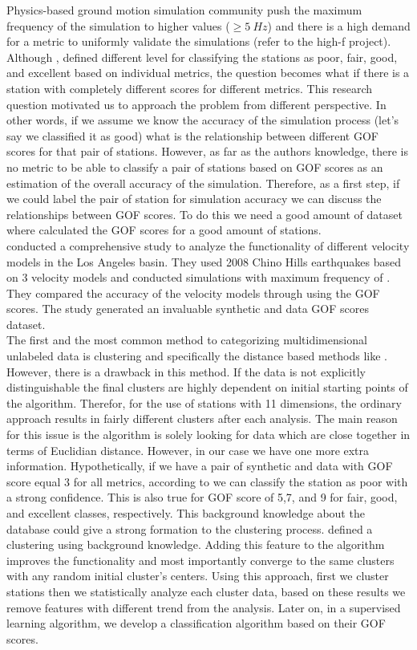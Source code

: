 Physics-based ground motion simulation community push the maximum frequency  of the simulation to higher values (\fmax{}$\geq 5 ~ Hz$) and there is a high demand for a metric to uniformly validate the simulations (refer to the high-f project). Although \citet{Anderson_2004_Proc}, defined different level for classifying the stations as poor, fair, good, and excellent based on individual metrics, the question becomes what if there is a station with completely different scores for different metrics. This research question motivated us to approach the problem from different perspective. In other words, if we assume we know the accuracy of the simulation process (let's say we classified it as good) what is the relationship between different GOF scores for that pair of stations. However, as far as the authors knowledge, there is no metric to be able to classify a pair of stations based on GOF scores as an estimation of the overall accuracy of the simulation. Therefore, as a first step, if we could label the pair of station for simulation accuracy we can discuss the relationships between GOF scores. To do this we need a good amount of dataset where calculated the GOF scores for a good amount of stations. \\  
 \citet{Taborda_2014_BSSA} conducted a comprehensive study to analyze the functionality of different velocity models in the Los Angeles basin. They used 2008 Chino Hills earthquakes based on 3 velocity models and conducted simulations with maximum frequency of . They compared the accuracy of the velocity models through using the GOF scores. The study generated an invaluable synthetic and data  GOF scores dataset.\\
The first and the most common method to categorizing multidimensional unlabeled data is clustering and specifically the distance based methods like \kmeans{} \citep{Macqueen_1967_Proc}. However, there is a drawback in this method. If the data is not explicitly distinguishable the final clusters are highly dependent on initial starting points of the algorithm. Therefor, for the use of stations with 11 dimensions, the ordinary \kmeans{} approach results in fairly different clusters after each analysis. The main reason for this issue is the algorithm is solely looking for data which are close together in terms of Euclidian distance. However, in our case we have one more extra information. Hypothetically, if we have a pair of synthetic and data with GOF score equal 3 for all metrics, according to \citet{Anderson_2004_Proc} we can classify the station as poor with a strong confidence. This is also true for GOF score of 5,7, and 9 for fair, good, and excellent classes, respectively. This background knowledge about the database could give a strong formation to the clustering process. \citet{Wagstaff_2001_Proc} defined a \kmeans{} clustering using background knowledge. Adding this feature to the algorithm improves the functionality and most importantly converge to the same clusters with any random initial cluster's centers. Using this approach, first we cluster stations then we statistically analyze each cluster data, based on these results we remove features with different trend from the analysis. Later on, in a supervised learning algorithm, we develop a classification algorithm based on their GOF scores.\\
